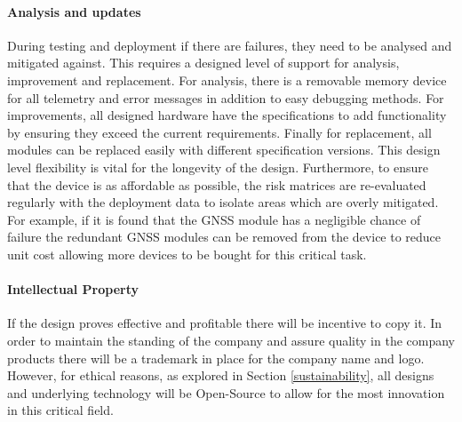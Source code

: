 \paragraph{Analysis and updates}
During testing and deployment if there are failures, they need to be analysed and mitigated against. This requires a designed level of support for analysis, improvement and replacement. For analysis, there is a removable memory device for all telemetry and error messages in addition to easy debugging methods. For improvements, all designed hardware have the specifications to add functionality by ensuring they exceed the current requirements. Finally for replacement, all modules can be replaced easily with different specification versions. This design level flexibility is vital for the longevity of the design. Furthermore, to ensure that the device is as affordable as possible, the risk matrices are re-evaluated regularly with the deployment data to isolate areas which are overly mitigated. For example, if it is found that the \gls{GNSS} module has a negligible chance of failure the redundant \gls{GNSS} modules can be removed from the device to reduce unit cost allowing more devices to be bought for this critical task.
\paragraph{Intellectual Property}
If the design proves effective and profitable there will be incentive to copy it. In order to maintain the standing of the company and assure quality in the company products there will be a trademark in place for the company name and logo. However, for ethical reasons, as explored in Section \ref{sustainability}, all designs and underlying technology will be Open-Source to allow for the most innovation in this critical field.